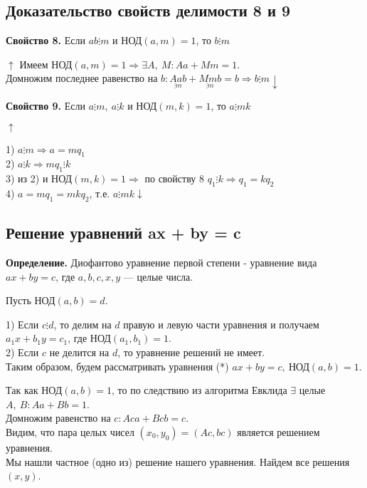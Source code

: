 \documentclass{article}
\begin{document}
    \subsection{Доказательство свойств делимости 8 и 9}
    \textbf{Свойство 8.} Если \( ab \vdots m \) и \( \textrm{НОД}(a, m) = 1 \), то \( b \vdots m \)

    \( \uparrow \) Имеем \( \textrm{НОД}(a,m) = 1 \Rightarrow \exists A,\ M: Aa + Mm = 1. \)\\
    Домножим последнее равенство на \( b: \underset{\vdots m}{Aab} + \underset{\vdots m}{Mmb} = b \Rightarrow b \vdots m \downarrow \)

    \textbf{Свойство 9.} Если \( a \vdots m,\ a \vdots k \) и \( \textrm{НОД}(m,k) = 1 \), то \(a \vdots mk \)

    \( \uparrow \)

    1) \( a \vdots m \Rightarrow a = mq_1 \)\\
    2) \( a \vdots k \Rightarrow mq_1 \vdots k \)\\
    3) из 2) и \( \textrm{НОД}(m,k) = 1 \Rightarrow \) по свойству 8 \( q_1 \vdots k \Rightarrow q_1 = kq_2 \)\\
    4) \( a = mq_1 = mkq_2 \), т.е. \( a \vdots mk \downarrow \)

    \subsection{Решение уравнений ax + by = c}
    \textbf{Определение.} Диофантово уравнение первой степени - уравнение вида \( ax + by = c \), где \( a,b,c,x,y \) --- целые числа.

    Пусть \( \textrm{НОД}(a,b) = d \).

    1) Если \( c \vdots d \), то делим на \( d \) правую и левую части уравнения и получаем \( a_1x + b_1y = c_1 \), где \( \textrm{НОД}(a_1, b_1) = 1 \).\\
    2) Если \( c \) не делится на \( d \), то уравнение решений не имеет.\\

    Таким образом, будем рассматривать уравнения (*) \( ax + by = c,\ \textrm{НОД}(a,b) = 1 \).
    
    Так как \( \textrm{НОД}(a, b) = 1 \), то по следствию из алгоритма Евклида \( \exists \) целые \( A,\ B: Aa + Bb = 1 \).\\
    Домножим равенство на \( c: Aca + Bcb = c \).\\
    Видим, что пара целых чисел \( (x_0,y_0) = (Ac, bc) \) является решением уравнения.\\
    Мы нашли частное (одно из) решение нашего уравнения. Найдем все решения \( (x,y) \).\\
\end{document}
